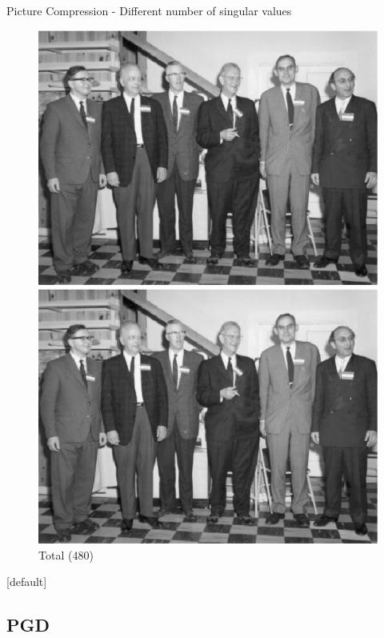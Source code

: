 \documentclass[10pt,a4paper]{beamer}
\begin{document}
\begin{frame}{Picture Compression - Different number of singular values}
\begin{figure}
\begin{minipage}{0.24\linewidth}
			\includegraphics[width=1\linewidth]{SVD/SVD.Tronquee.256.eps}
				\caption{256 values}
		\end{minipage}
		\begin{minipage}{0.24\linewidth}
			\includegraphics[width=1\linewidth]{SVD/SVD.Total.eps}
				\caption{Total (480)}
		\end{minipage}
	\end{figure}
\end{frame}

[default]

\subsection{PGD}
\end{document}
